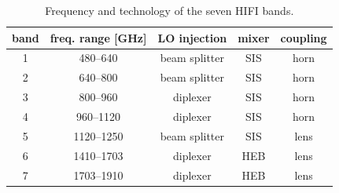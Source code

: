 \begin{table}
    \centering
    \begin{tabular}{ccccc}
        \toprule
        band & freq. range [\si{\giga\hertz}] & LO injection & mixer & coupling \\
        \midrule
        1 &  480--640  & beam splitter & SIS & horn\\
        2 &  640--800  & beam splitter & SIS & horn\\
        3 &  800--960  & diplexer      & SIS & horn\\
        4 &  960--1120 & diplexer      & SIS & horn\\
        5 & 1120--1250 & beam splitter & SIS & lens\\
        6 & 1410--1703 & diplexer      & HEB & lens\\
        7 & 1703--1910 & diplexer      & HEB & lens\\
        \bottomrule
    \end{tabular}
    \caption{Frequency and technology of the seven HIFI bands.}
    \label{tab:sevenbands}
\end{table}
